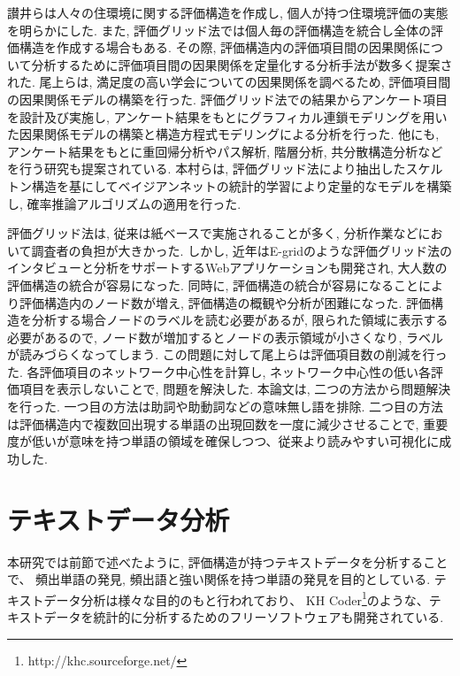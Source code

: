 \documentclass[syuuron]{kuee}
\begin{document}
		讃井らは人々の住環境に関する評価構造を作成し, 個人が持つ住環境評価の実態を明らかにした. 
		また, 評価グリッド法では個人毎の評価構造を統合し全体の評価構造を作成する場合もある. 
		その際, 評価構造内の評価項目間の因果関係について分析するために評価項目間の因果関係を定量化する分析手法が数多く提案された. 
		尾上らは, 満足度の高い学会についての因果関係を調べるため, 評価項目間の因果関係モデルの構築を行った\cite{egm8}. 
		評価グリッド法での結果からアンケート項目を設計及び実施し, アンケート結果をもとにグラフィカル連鎖モデリングを用いた因果関係モデルの構築と構造方程式モデリングによる分析を行った. 
		他にも, アンケート結果をもとに重回帰分析やパス解析, 階層分析, 共分散構造分析などを行う研究も提案されている. 
		本村らは, 評価グリッド法により抽出したスケルトン構造を基にしてベイジアンネットの統計的学習により定量的なモデルを構築し, 確率推論アルゴリズムの適用を行った\cite{egm9}. 
		
		評価グリッド法は, 従来は紙ベースで実施されることが多く, 分析作業などにおいて調査者の負担が大きかった. 
		しかし, 近年はE-gridのような評価グリッド法のインタビューと分析をサポートするWebアプリケーションも開発され, 大人数の評価構造の統合が容易になった. 
		同時に, 評価構造の統合が容易になることにより評価構造内のノード数が増え, 評価構造の概観や分析が困難になった. 
		評価構造を分析する場合ノードのラベルを読む必要があるが, 限られた領域に表示する必要があるので, 
		ノード数が増加するとノードの表示領域が小さくなり, ラベルが読みづらくなってしまう. 
		この問題に対して尾上らは評価項目数の削減を行った\cite{net1}. 
		各評価項目のネットワーク中心性を計算し, ネットワーク中心性の低い各評価項目を表示しないことで, 問題を解決した. 
		本論文は, 二つの方法から問題解決を行った. 
		一つ目の方法は助詞や助動詞などの意味無し語を排除. 二つ目の方法は評価構造内で複数回出現する単語の出現回数を一度に減少させることで, 
		重要度が低いが意味を持つ単語の領域を確保しつつ、従来より読みやすい可視化に成功した. 
		
	\section{テキストデータ分析}
		本研究では前節で述べたように, 評価構造が持つテキストデータを分析することで、
		頻出単語の発見, 頻出語と強い関係を持つ単語の発見を目的としている.  
		テキストデータ分析は様々な目的のもと行われており、
		KH Coder\footnote{http://khc.sourceforge.net/}のような、テキストデータを統計的に分析するためのフリーソフトウェアも開発されている. 
		
\end{document}
